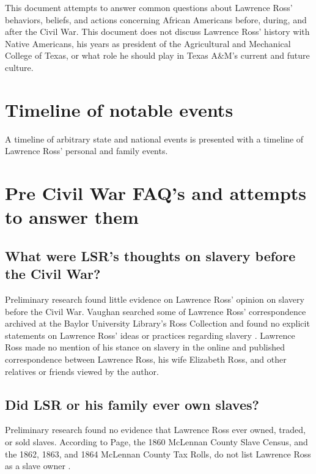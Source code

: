 \documentclass[12pt]{article}
\begin{document}
This document attempts to answer common questions about Lawrence Ross' behaviors, beliefs, and actions concerning African Americans before, during, and after the Civil War. This document does not discuss Lawrence Ross' history with Native Americans, his years as president of the Agricultural and Mechanical College of Texas, or what role he should play in Texas A\&M's current and future culture. 

\newpage
\section{Timeline of notable events}
A timeline of arbitrary state and national events is presented with a timeline of Lawrence Ross' personal and family events. 



\newpage
\section{Pre Civil War FAQ's and attempts to answer them}

\subsection{What were LSR's thoughts on slavery before the Civil War? }
Preliminary research found little evidence on Lawrence Ross' opinion on slavery before the Civil War. Vaughan searched some of Lawrence Ross' correspondence archived at the Baylor University Library's Ross Collection and found no explicit statements on Lawrence Ross' ideas or practices regarding slavery \cite{vaughan:email}. Lawrence Ross made no mention of his stance on slavery in the online and published correspondence between Lawrence Ross, his wife Elizabeth Ross, and other relatives or friends viewed by the author. 

\newpage
\subsection{Did LSR or his family ever own slaves? }
Preliminary research found no evidence that Lawrence Ross ever owned, traded, or sold slaves. According to Page, the 1860 McLennan County Slave Census, and the 1862, 1863, and 1864 McLennan County Tax Rolls, do not list Lawrence Ross as a slave owner \cite[pg.49]{page}.
\end{document}

